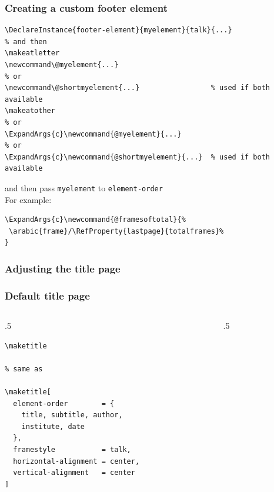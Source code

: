 \documentclass{ltx-talk}
\begin{document}
\begin{frame*}
\frametitle{Creating a custom footer element}
\lstset{aboveskip=0pt,belowskip=0pt}
\begin{lstlisting}
\DeclareInstance{footer-element}{myelement}{talk}{...}
% and then
\makeatletter
\newcommand\@myelement{...}
% or
\newcommand\@shortmyelement{...}                 % used if both available
\makeatother
% or
\ExpandArgs{c}\newcommand{@myelement}{...}
% or
\ExpandArgs{c}\newcommand{@shortmyelement}{...}  % used if both available
\end{lstlisting}
and then pass \texttt{myelement} to \texttt{element-order}\\
For example:
\begin{lstlisting}
\ExpandArgs{c}\newcommand{@framesoftotal}{%
 \arabic{frame}/\RefProperty{lastpage}{totalframes}%
}
\end{lstlisting}
\end{frame*}

\subsubsection{Adjusting the title page}

\begin{frame*}
\frametitle{Default title page}
\begin{columns}
\begin{column}{.5\textwidth}
\begin{lstlisting}
\maketitle

% same as

\maketitle[
  element-order        = {
    title, subtitle, author,
    institute, date
  },
  framestyle           = talk,
  horizontal-alignment = center,
  vertical-alignment   = center
]
\end{lstlisting}
\end{column}
\begin{column}{.5\textwidth}
\maketitle
\end{column}
\end{columns}
\end{frame*}
\end{document}
